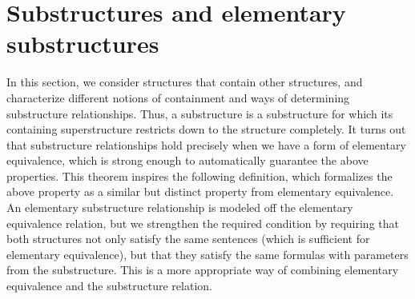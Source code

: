 \documentclass{article}
\begin{document}
\section{Substructures and elementary substructures}
In this section, we consider structures that contain other structures, and characterize different notions of containment and ways of determining substructure relationships.
\n
Thus, a substructure is a substructure for which its containing superstructure restricts down to the structure completely.
\nn
It turns out that substructure relationships hold precisely when we have a form of elementary equivalence, which is strong enough to automatically guarantee the above properties.
This theorem inspires the following definition, which formalizes the above property as a similar but distinct property from elementary equivalence.
\n
An elementary substructure relationship is modeled off the elementary equivalence relation, but we strengthen the required condition by requiring that both structures not only satisfy the same sentences (which is sufficient for elementary equivalence), but that they satisfy the same formulas with parameters from the substructure. This is a more appropriate way of combining elementary equivalence and the substructure relation.
\end{document}
